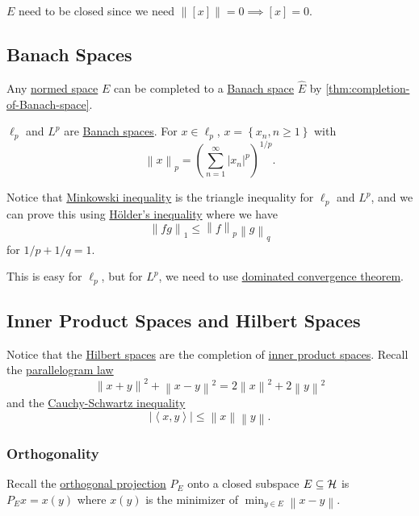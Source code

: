 \begin{remark}
	\(E\) need to be closed since we need \(\left\lVert [x]\right\rVert = 0 \implies [x] = 0\).
\end{remark}

\subsection{Banach Spaces}
Any \hyperref[def:normed-vector-space]{normed space} \(E\) can be completed to a \hyperref[def:Banach-space]{Banach space} \(\hat{E} \) by \autoref{thm:completion-of-Banach-space}.

\begin{eg}
	\(\ell _p\) and \(L^p\) are \hyperref[def:Banach-space]{Banach spaces}. For \(x\in \ell _p\), \(x= \left\{ x_n, n\geq 1 \right\} \) with
	\[
		\left\lVert x\right\rVert _p = \left( \sum_{n=1} ^{\infty} \left\vert x_n \right\vert ^p \right) ^{1 / p}.
	\]
\end{eg}

Notice that \hyperref[lma:Minkowski-ineq]{Minkowski inequality} is the triangle inequality for \(\ell _p\) and \(L^p\), and we can prove this using \hyperref[lma:Holder-ineq]{Hölder's inequality} where we have
\[
	\left\lVert fg\right\rVert _1 \leq \left\lVert f\right\rVert _p \left\lVert g\right\rVert _q
\]
for \(1 / p + 1 / q = 1\).

\begin{remark}
	This is easy for \(\ell _p\), but for \(L^p\), we need to use \href{https://en.wikipedia.org/wiki/Dominated_convergence_theorem}{dominated convergence theorem}.
\end{remark}

\subsection{Inner Product Spaces and Hilbert Spaces}
Notice that the \hyperref[def:Hilbert-space]{Hilbert spaces} are the completion of \hyperref[def:inner-product-space]{inner product spaces}. Recall the \hyperref[lma:parallelogram-law]{parallelogram law}
\[
	\left\lVert x + y\right\rVert ^{2} + \left\lVert x - y\right\rVert ^{2} = 2\left\lVert x\right\rVert ^{2} + 2 \left\lVert y\right\rVert ^{2}
\]
and the \hyperref[thm:Cauchy-Schwartz-ineq]{Cauchy-Schwartz inequality}
\[
	\left\vert \left\langle x, y \right\rangle  \right\vert \leq \left\lVert x\right\rVert \left\lVert y\right\rVert.
\]

\subsubsection{Orthogonality}
Recall the \hyperref[def:orthogonal-projection]{orthogonal projection} \(P_E\) onto a closed subspace \(E \subseteq \mathcal{\MakeUppercase{h}} \) is \(P_E x = x(y)\) where \(x(y)\) is the minimizer of \(\min _{y\in E} \left\lVert x - y\right\rVert \).

